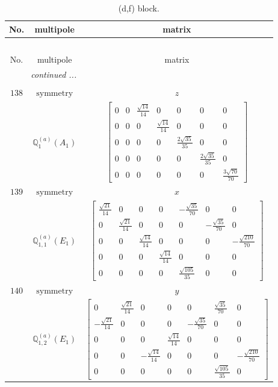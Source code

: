 \documentclass[fleqn,8pt,landscape]{jsarticle}
\begin{document}
\begin{longtable}{ccc}
\caption{(d,f) block.}
 \\
 \hline \hline
No. & multipole & matrix \\ \hline \endfirsthead

\multicolumn{2}{l}{\tablename\ \thetable{}} \\
 \hline \hline
No. & multipole & matrix \\ \hline \endhead

 \hline \hline
\multicolumn{2}{r}{\footnotesize\it continued ...} \\ \endfoot

 \hline \hline
\multicolumn{2}{r}{} \\ \endlastfoot

$ 138 $ & $ \text{symmetry} $ & $ z $ \\
$  $ & $ \mathbb{Q}_{1}^{(a)}(A_{1}) $ & $ \begin{bmatrix} 0 & 0 & \frac{\sqrt{14}}{14} & 0 & 0 & 0 & 0 \\ 0 & 0 & 0 & \frac{\sqrt{14}}{14} & 0 & 0 & 0 \\ 0 & 0 & 0 & 0 & \frac{2 \sqrt{35}}{35} & 0 & 0 \\ 0 & 0 & 0 & 0 & 0 & \frac{2 \sqrt{35}}{35} & 0 \\ 0 & 0 & 0 & 0 & 0 & 0 & \frac{3 \sqrt{70}}{70} \end{bmatrix} $ \\ \hline
$ 139 $ & $ \text{symmetry} $ & $ x $ \\
$  $ & $ \mathbb{Q}_{1,1}^{(a)}(E_{1}) $ & $ \begin{bmatrix} \frac{\sqrt{21}}{14} & 0 & 0 & 0 & - \frac{\sqrt{35}}{70} & 0 & 0 \\ 0 & \frac{\sqrt{21}}{14} & 0 & 0 & 0 & - \frac{\sqrt{35}}{70} & 0 \\ 0 & 0 & \frac{\sqrt{14}}{14} & 0 & 0 & 0 & - \frac{\sqrt{210}}{70} \\ 0 & 0 & 0 & \frac{\sqrt{14}}{14} & 0 & 0 & 0 \\ 0 & 0 & 0 & 0 & \frac{\sqrt{105}}{35} & 0 & 0 \end{bmatrix} $ \\ \hline
$ 140 $ & $ \text{symmetry} $ & $ y $ \\
$  $ & $ \mathbb{Q}_{1,2}^{(a)}(E_{1}) $ & $ \begin{bmatrix} 0 & \frac{\sqrt{21}}{14} & 0 & 0 & 0 & \frac{\sqrt{35}}{70} & 0 \\ - \frac{\sqrt{21}}{14} & 0 & 0 & 0 & - \frac{\sqrt{35}}{70} & 0 & 0 \\ 0 & 0 & 0 & \frac{\sqrt{14}}{14} & 0 & 0 & 0 \\ 0 & 0 & - \frac{\sqrt{14}}{14} & 0 & 0 & 0 & - \frac{\sqrt{210}}{70} \\ 0 & 0 & 0 & 0 & 0 & \frac{\sqrt{105}}{35} & 0 \end{bmatrix} $ \\ \hline

\end{longtable}
\end{document}
